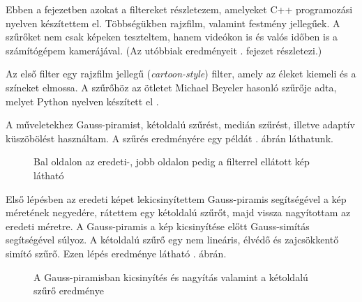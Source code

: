 
\label{chap:filters}

Ebben a fejezetben azokat a filtereket részletezem, amelyeket C++ programozási nyelven készítettem el. Többségükben rajzfilm, valamint festmény jellegűek. A szűrőket nem csak képeken teszteltem, hanem videókon is és valós időben is a számítógépem kamerájával. (Az utóbbiak eredményeit . fejezet részletezi.)


Az első filter egy rajzfilm jellegű (\textit{cartoon-style}) filter, amely az éleket kiemeli és a színeket elmossa. A szűrőhöz az ötletet Michael Beyeler hasonló szűrője adta, melyet Python nyelven készített el \cite{beyeler}.

A műveletekhez Gauss-piramist, kétoldalú szűrést, medián szűrést, illetve adaptív küszöbölést használtam. A szűrés eredményére egy példát . ábrán láthatunk.

\begin{figure}[ht]
\centering
{}
\caption{Bal oldalon az eredeti-, jobb oldalon pedig a filterrel ellátott kép látható} 
\label{fig:cartoon1}
\end{figure}


Első lépésben az eredeti képet lekicsinyítettem Gauss-piramis segítségével a kép méretének negyedére, rátettem egy kétoldalú szűrőt, majd vissza nagyítottam az eredeti méretre. A Gauss-piramis a kép kicsinyítése előtt Gauss-simítás segítségével súlyoz. A kétoldalú szűrő egy nem lineáris, élvédő és zajcsökkentő simító szűrő. Ezen lépés eredménye látható . ábrán.

\begin{figure}[ht]
\centering
{}
\caption{A Gauss-piramisban kicsinyítés és nagyítás valamint a kétoldalú szűrő eredménye } 
\label{fig:cartoon2}
\end{figure}


